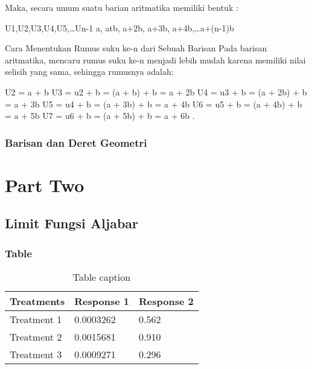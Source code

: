 \documentclass[11pt,fleqn]{book} %
\begin{document}
Maka, secara umum suatu barian aritmatika memiliki bentuk :

U1,U2,U3,U4,U5,…Un-1
a, atb, a+2b, a+3b, a+4b,…a+(n-1)b

Cara Menentukan Rumus suku ke-n dari Sebuah Barisan
Pada barisan aritmatika, mencaru rumus suku ke-n menjadi lebih mudah karena memiliki nilai selisih yang sama, sehingga rumusnya adalah:

U2 = a + b
U3 = u2 + b = (a + b) + b = a + 2b
U4 = u3 + b = (a + 2b) + b = a + 3b
U5 = u4 + b = (a + 3b) + b = a + 4b
U6 = u5 + b = (a + 4b) + b = a + 5b
U7 = u6 + b = (a + 5b) + b = a + 6b
.
\section{Barisan dan Deret Geometri}


\part{Part Two}



\chapter{Limit Fungsi Aljabar}

\section{Table}

\begin{table}[h]
\centering
\begin{tabular}{l l l}
\toprule
\textbf{Treatments} & \textbf{Response 1} & \textbf{Response 2}\\
\midrule
Treatment 1 & 0.0003262 & 0.562 \\
Treatment 2 & 0.0015681 & 0.910 \\
Treatment 3 & 0.0009271 & 0.296 \\
\bottomrule
\end{tabular}
\caption{Table caption}
\end{table}
\end{document}
